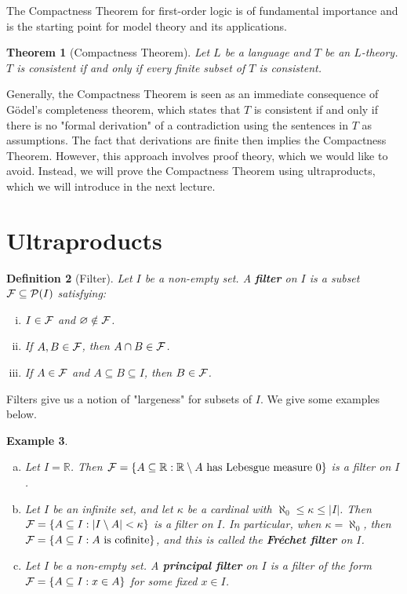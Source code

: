 \documentclass[10pt]{article}
\newcommand{\R}{\mathbb{R}}
\theoremstyle{newstyle}
\newtheorem{thm}{Theorem}[section]
\newtheorem{defn}[thm]{Definition}
\newtheorem{exmp}[thm]{Example}
\begin{document}
The Compactness Theorem for first-order logic is of fundamental importance and is the 
starting point for model theory and its applications. 

\begin{thm}[Compactness Theorem]
Let $L$ be a language and $T$ be an $L$-theory. $T$ is consistent if and only if every 
finite subset of $T$ is consistent.
\end{thm}

Generally, the Compactness Theorem is seen as an immediate consequence of G\"odel's 
completeness theorem, which states that $T$ is consistent if and only if there is no 
"formal derivation" of a contradiction using the sentences in $T$ as assumptions. 
The fact that derivations are finite then implies the Compactness Theorem. 
However, this approach involves proof theory, which we would like to avoid. 
Instead, we will prove the Compactness Theorem using ultraproducts, which we will introduce 
in the next lecture. 

\newpage 
\section{Ultraproducts}

\begin{defn}[Filter]
Let $I$ be a non-empty set. A {\bf filter} on $I$ is a subset ${\cal F} \subseteq {\cal P}(I)$ 
satisfying:
\begin{enumerate}[(i)]
    \item $I \in {\cal F}$ and $\varnothing \notin {\cal F}$. 
    \item If $A, B \in {\cal F}$, then $A \cap B \in {\cal F}$. 
    \item If $A \in {\cal F}$ and $A \subseteq B \subseteq I$, then $B \in {\cal F}$.
\end{enumerate}
\end{defn}

Filters give us a notion of "largeness" for subsets of $I$. We give some examples below.

\begin{exmp}~
\begin{enumerate}[(a)]
    \item Let $I = \R$. Then ${\cal F} = \{A \subseteq \R : \R \setminus A \text{ 
    has Lebesgue measure } 0\}$ is a filter on $I$.
    \item Let $I$ be an infinite set, and let $\kappa$ be a cardinal with 
    $\aleph_0 \leq \kappa \leq |I|$. Then ${\cal F} = \{A \subseteq I 
    : |I \setminus A| < \kappa\}$ is a filter on $I$. In particular, when
    $\kappa = \aleph_0$, then ${\cal F} = \{A \subseteq I : A \text{ is cofinite}\}$, 
    and this is called the {\bf Fr\'echet filter} on $I$.
    \item Let $I$ be a non-empty set. A {\bf principal filter} on $I$ 
    is a filter of the form ${\cal F} = 
    \{A \subseteq I : x \in A\}$ for some fixed $x \in I$.
\end{enumerate}
\end{exmp}
\end{document}
